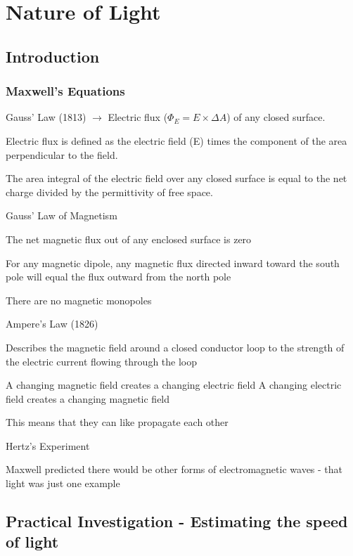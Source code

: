 
\chapter{Nature of Light}
	
\section{Introduction}
	
	\subsection{Maxwell's Equations}
	
		Gauss' Law (1813) $\rightarrow$ Electric flux ($\Phi_E = E \times \Delta A$) of any closed surface.

		Electric flux is defined as the electric field (E) times the component of the area perpendicular to the field.

		The area integral of the electric field over any closed surface is equal to the net charge divided by the permittivity of free space.

		Gauss' Law of Magnetism

		The net magnetic flux out of any enclosed surface is zero

		For any magnetic dipole, any magnetic flux directed inward toward the south pole will equal the flux outward from the north pole

		There are no magnetic monopoles

		Ampere's Law (1826)

		Describes the magnetic field around a closed conductor loop to the strength of the electric current flowing through the loop

		A changing magnetic field creates a changing electric field
		A changing electric field creates a changing magnetic field

		This means that they can like propagate each other


		Hertz's Experiment

		Maxwell predicted there would be other forms of electromagnetic waves - that light was just one example

\newpage

\section{Practical Investigation - Estimating the speed of light}

